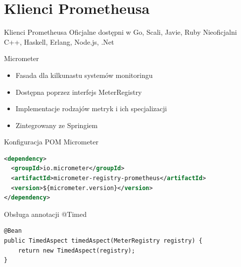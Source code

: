 \documentclass[epic,eepic,aspectratio=169,12pt]{beamer}
\begin{document}
\section{Klienci Prometheusa}
\begin{frame}{Klienci Prometheusa}
	Oficjalne dostępni w Go, Scali, Javie, Ruby
	Nieoficjalni C++, Haskell, Erlang, Node.js, .Net		
\end{frame}
\begin{frame}{Micrometer}	
	\begin{itemize}
		\item Fasada dla kilkunastu systemów monitoringu
		\item Dostępna poprzez interfejs MeterRegistry
		\item Implementacje rodzajów metryk i ich specjalizacji
		\item Zintegrowany ze Springiem
	\end{itemize}
\end{frame}
\begin{frame}[fragile]{Konfiguracja POM Micrometer}
	\begin{lstlisting}[language=XML]
<dependency>
  <groupId>io.micrometer</groupId>
  <artifactId>micrometer-registry-prometheus</artifactId>
  <version>${micrometer.version}</version>
</dependency>
	\end{lstlisting}
\end{frame}
\begin{frame}[fragile]{Obsługa annotacji @Timed}
		\begin{lstlisting}
@Bean
public TimedAspect timedAspect(MeterRegistry registry) {
	return new TimedAspect(registry);
}
		\end{lstlisting}
\end{frame}
\end{document}

